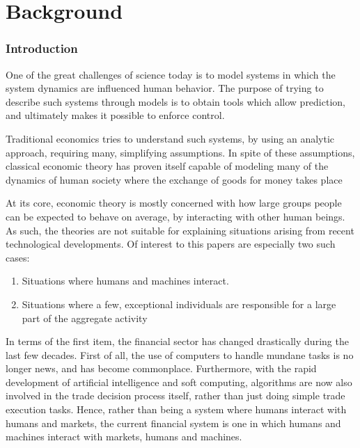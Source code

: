\part{Background}
\begin{comment}
Many models of artificial markets resemble typical game theoretic models in that all trading is round based. Typically all agents receive the market information and evaluate their strategies once every round. Such models are very useful when all agents are more or less equally fast, since it is then reasonable to assume that they have access to the same information. 

The model proposed in this work is different from such models in that it assumes that agents generally do \textit{not} have access to the same information when they evaluate their strategies. 
\end{comment}



\section{Introduction}
One of the great challenges of science today is to model systems in which the system dynamics are influenced  human behavior. The purpose of trying to describe such systems through models is to obtain tools which allow prediction, and ultimately makes it possible to enforce control.

Traditional economics tries to understand such systems, by using an analytic approach, requiring many, simplifying assumptions. In spite of these assumptions, classical economic theory has proven itself capable of modeling many of the dynamics of human society where the exchange of goods for money takes place

At its core, economic theory is mostly concerned with how large groups people can be expected to behave on average, by interacting with other human beings. As such, the theories are not suitable for explaining situations arising from recent technological developments. Of interest to this papers are especially two such cases:
\begin{enumerate}
\item Situations where humans and machines interact.
\item Situations where a few, exceptional individuals are responsible for a large part of the aggregate activity
\end{enumerate}
In terms of the first item, the financial sector has changed drastically during the last few decades. First of all, the use of computers to handle mundane tasks is no longer news, and has become commonplace. Furthermore, with the rapid development of artificial intelligence and soft computing, algorithms are now also involved in the trade decision process itself, rather than just doing simple trade execution tasks. Hence, rather than being a system where humans interact with humans and markets, the current financial system is one in which humans and machines interact with markets, humans and machines. 

